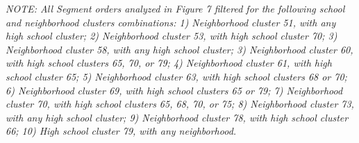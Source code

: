 \documentclass[
  12pt,
]{article}
\begin{document}
\emph{NOTE: All Segment orders analyzed in Figure 7 filtered for the following school and neighborhood clusters combinations: 1) Neighborhood cluster 51, with any high school cluster; 2) Neighborhood cluster 53, with high school cluster 70; 3) Neighborhood cluster 58, with any high school cluster; 3) Neighborhood cluster 60, with high school clusters 65, 70, or 79; 4) Neighborhood cluster 61, with high school cluster 65; 5) Neighborhood cluster 63, with high school clusters 68 or 70; 6) Neighborhood cluster 69, with high school clusters 65 or 79; 7) Neighborhood cluster 70, with high school clusters 65, 68, 70, or 75; 8) Neighborhood cluster 73, with any high school cluster; 9) Neighborhood cluster 78, with high school cluster 66; 10) High school cluster 79, with any neighborhood.}
\endgroup

\clearpage
\end{document}
